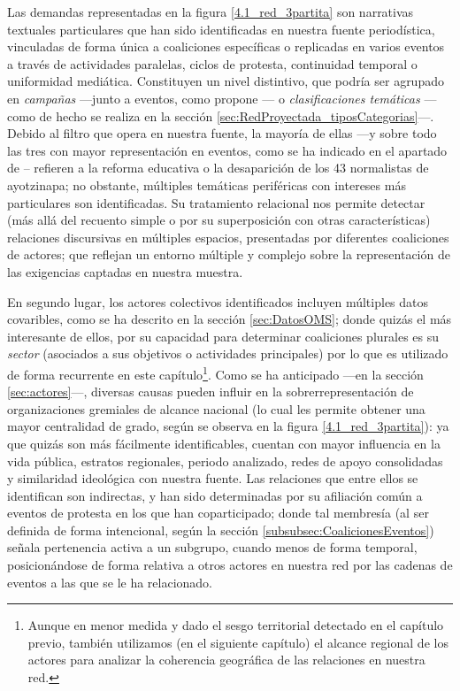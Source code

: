 \documentclass[letterpaper, 11pt]{book}
\theoremstyle{definition}
\theoremstyle{remark}
\begin{document}
Las demandas representadas en la figura \ref{4.1_red_3partita} son narrativas textuales particulares que han sido identificadas en nuestra fuente periodística, vinculadas de forma única a coaliciones específicas o replicadas en varios eventos a través de actividades paralelas, ciclos de protesta, continuidad temporal o uniformidad mediática. 
Constituyen un nivel distintivo, que podría ser agrupado en \emph{campañas} ---junto a eventos, como propone \citet{2003_Wada_Tesis}--- o \emph{clasificaciones temáticas} ---como de hecho se realiza en la sección \ref{sec:RedProyectada_tiposCategorias}---. 
Debido al filtro que opera en nuestra fuente, la mayoría de ellas ---y sobre todo las tres con mayor representación en eventos, como se ha indicado en el apartado de -- refieren a la reforma educativa o la desaparición de los 43 normalistas de ayotzinapa; no obstante, múltiples temáticas periféricas con intereses más particulares son identificadas. 
Su tratamiento relacional nos permite detectar (más allá del recuento simple o por su superposición con otras características) relaciones discursivas en múltiples espacios, presentadas por diferentes coaliciones de actores; que reflejan un entorno múltiple y complejo sobre la representación de las exigencias captadas en nuestra muestra. 


En segundo lugar, los actores colectivos identificados incluyen múltiples datos covaribles, como se ha descrito en la sección \ref{sec:DatosOMS}; donde quizás el más interesante de ellos, por su capacidad para determinar coaliciones plurales es su \emph{sector} (asociados a sus objetivos o actividades principales) por lo que es utilizado de forma recurrente en este capítulo\footnote{
   Aunque en menor medida y dado el sesgo territorial detectado en el capítulo previo, también utilizamos (en el siguiente capítulo) el alcance regional de los actores para analizar la coherencia geográfica de las relaciones en nuestra red.  
}. 
Como se ha anticipado ---en la sección \ref{sec:actores}---, diversas causas pueden influir en la sobrerrepresentación de organizaciones gremiales de alcance nacional (lo cual les permite obtener una mayor centralidad de grado, según se observa en la figura \ref{4.1_red_3partita}): ya que quizás son más fácilmente identificables, cuentan con mayor influencia en la vida pública, estratos regionales, periodo analizado, redes de apoyo consolidadas y similaridad ideológica con nuestra fuente. 
Las relaciones que entre ellos se identifican son indirectas, y han sido determinadas por su afiliación común a eventos de protesta en los que han coparticipado; donde tal membresía (al ser definida de forma intencional, según la sección \ref{subsubsec:CoalicionesEventos}) señala pertenencia activa a un subgrupo, cuando menos de forma temporal, posicionándose de forma relativa a otros actores en nuestra red por las cadenas de eventos a las que se le ha relacionado. 
\end{document}
